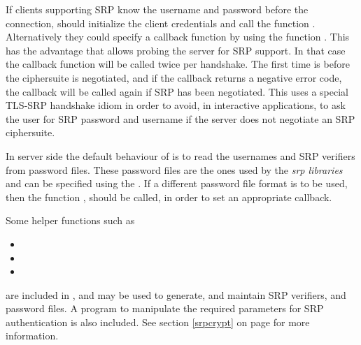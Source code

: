 If clients supporting SRP know the username and password before the connection,
should initialize the client credentials and call the
function .
Alternatively they could specify a callback function by using the
function .
This has the advantage that allows probing the server for SRP support.
In that case the callback function will be called twice per handshake.
The first time is before the ciphersuite is negotiated, and 
if the callback returns a negative error code, the callback will be 
called again if SRP has been negotiated. 
This uses a special TLS-SRP handshake idiom in order to avoid, in
interactive applications, to ask the user for SRP password and username 
if the server does not negotiate an SRP ciphersuite.
\par
In server side the default behaviour of \gnutls{} is to read the usernames 
and SRP verifiers from password files. These password files are the ones used
by the \emph{srp libraries} and can be specified using the
.
If a different password file format is to be used, then the 
function ,
should be called, in order to set an appropriate callback.
\par
Some helper functions such as
\begin{itemize}
\item {}
\item {}
\item {}
\end{itemize}
are included in \gnutls{}, and may be used to generate, and maintain
SRP verifiers, and password files. 
A program to manipulate the required parameters 
for SRP authentication is also included. See section \ref{srpcrypt} on 
page \pageref{srpcrypt} for more information.


